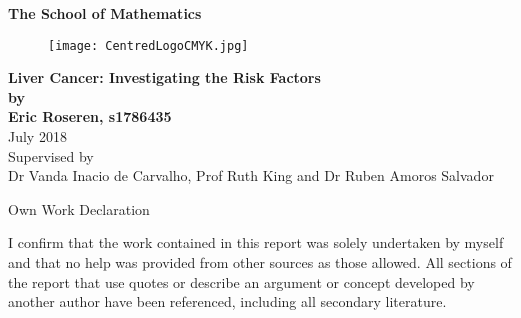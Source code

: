 \documentclass[11pt,twoside]{article}
\numberwithin{Theorem}{section}
\numberwithin{Definition}{section}
\numberwithin{Lemma}{section}
\numberwithin{Algorithm}{section}
\numberwithin{equation}{section}
\begin{document}
%
\pagestyle{empty}
%
\begin{titlepage}
\vspace*{.5em}
\center
\textbf{\large{The School of Mathematics}} \\
\vspace*{1em}
\begin{figure}[!h]
\centering
\texttt{[image: CentredLogoCMYK.jpg]}
\end{figure}
\vspace{2em}
\textbf{\Huge{Liver Cancer: Investigating the Risk Factors}}\\[2em]
\textbf{\LARGE{by}}\\
\vspace{2em}
\textbf{\LARGE{Eric Roseren, s1786435}}\\
\vspace{6.5em}
\vspace{6.5em}
\Large{July 2018}\\
\vspace{3em}
\normalsize{Supervised by\\Dr Vanda Inacio de Carvalho, Prof Ruth King and Dr Ruben Amoros Salvador}
\vfill
\end{titlepage}
%
\clearpage
%
%
%
%
%
\begin{center}
\Large{Own Work Declaration}
\end{center}
I confirm that the work contained in this report was solely undertaken by myself and that no help was provided from other sources as those allowed. All sections of the report that use quotes or describe an argument or concept developed by another author have been referenced, including all
secondary literature.%
\cleardoublepage
%
%
%
\pagestyle{plain}
\setcounter{page}{1}
%
\cleardoublepage
%
\setcounter{page}{1}
%
%
\clearpage
\end{document}
